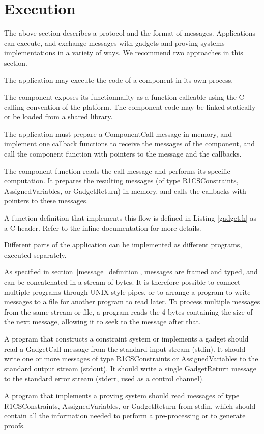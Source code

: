 \section{Execution}
\label{sec:execution}

The above section describes a protocol and the format of messages.
Applications can execute, and exchange messages with
gadgets and proving systems implementations in a variety of ways.
We recommend two approaches in this section.


The application may execute the code of a component in its own process.

The component exposes its functionnality as a function calleable using the C calling convention of the platform. The component code may be linked statically or be loaded from a shared library.

The application must prepare a ComponentCall message in memory, and implement one callback functions to receive the messages of the component,
and call the component function with pointers to the message and the callbacks.

The component function reads the call message and performs its specific computation. It prepares the resulting messages (of type R1CSConstraints, AssignedVariables, or GadgetReturn) in memory, and calls the callbacks with pointers to these messages.

A function definition that implements this flow is defined in Listing \ref{gadget.h} as a C header. Refer to the inline documentation for more details.



Different parts of the application can be implemented as different
programs, executed separately.

As specified in section~\ref{message_definition}, messages are framed and typed,
and can be concatenated in a stream of bytes. It is therefore possible to connect multiple programs through UNIX-style pipes, or to arrange a program to write messages to a file for another program to read later.
To process multiple messages from the same stream or file, a program
reads the 4 bytes containing the size of the next message, allowing it to seek
to the message after that.

A program that constructs a constraint system or implements a gadget should read a GadgetCall message from the standard input stream (stdin).
It should write one or more messages of type R1CSConstraints or AssignedVariables to the standard output stream (stdout).
It should write a single GadgetReturn message to the standard error stream
(stderr, used as a control channel).

A program that implements a proving system should read messages of type R1CSConstraints, AssignedVariables, or GadgetReturn from stdin,
which should contain all the information needed to perform a pre-processing
or to generate proofs.
